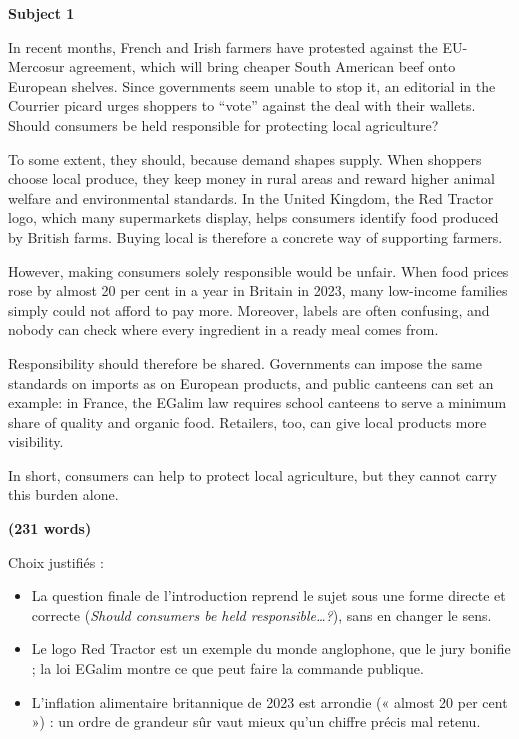 \documentclass[11pt,a4paper]{article}
\providecommand{\tightlist}{\setlength{\itemsep}{0pt}\setlength{\parskip}{0pt}}
\begin{document}
\textbf{Subject 1}

In recent months, French and Irish farmers have protested against the EU-Mercosur agreement, which will bring cheaper South American beef onto European shelves. Since governments seem unable to stop it, an editorial in the Courrier picard urges shoppers to ``vote'' against the deal with their wallets. Should consumers be held responsible for protecting local agriculture?

To some extent, they should, because demand shapes supply. When shoppers choose local produce, they keep money in rural areas and reward higher animal welfare and environmental standards. In the United Kingdom, the Red Tractor logo, which many supermarkets display, helps consumers identify food produced by British farms. Buying local is therefore a concrete way of supporting farmers.

However, making consumers solely responsible would be unfair. When food prices rose by almost 20 per cent in a year in Britain in 2023, many low-income families simply could not afford to pay more. Moreover, labels are often confusing, and nobody can check where every ingredient in a ready meal comes from.

Responsibility should therefore be shared. Governments can impose the same standards on imports as on European products, and public canteens can set an example: in France, the EGalim law requires school canteens to serve a minimum share of quality and organic food. Retailers, too, can give local products more visibility.

In short, consumers can help to protect local agriculture, but they cannot carry this burden alone.

\textbf{(231 words)}

Choix justifiés :

\begin{itemize}
\tightlist
\item
  La question finale de l'introduction reprend le sujet sous une forme directe et correcte (\emph{Should consumers be held responsible\ldots?}), sans en changer le sens.
\item
  Le logo Red Tractor est un exemple du monde anglophone, que le jury bonifie ; la loi EGalim montre ce que peut faire la commande publique.
\item
  L'inflation alimentaire britannique de 2023 est arrondie (« almost 20 per cent ») : un ordre de grandeur sûr vaut mieux qu'un chiffre précis mal retenu.
\end{itemize}
\end{document}
